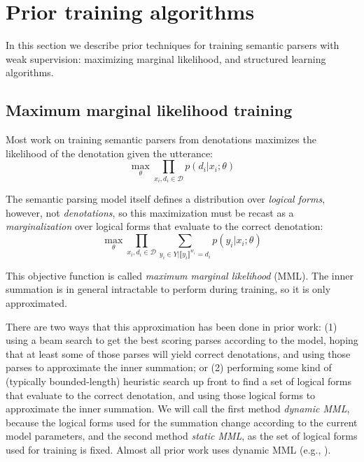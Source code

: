 \section{Prior training algorithms} \label{sec:prior_training}

In this section we describe prior techniques for training semantic parsers with weak supervision: maximizing marginal likelihood, and structured learning algorithms.

\subsection{Maximum marginal likelihood training} \label{sec:mml}

Most work on training semantic parsers from denotations maximizes the likelihood of the denotation given the utterance:
\begin{equation}
\max_\theta \prod_{x_i,d_i \in \mathcal{D}} p(d_i|x_i; \theta)
\end{equation}

\noindent
The semantic parsing model itself defines a distribution over \emph{logical forms}, however, not \emph{denotations}, so this maximization must be recast as a \emph{marginalization} over logical forms that evaluate to the correct denotation:
\begin{equation}
\max_\theta \prod_{x_i,d_i \in \mathcal{D}} \sum_{y_i \in Y | \llbracket y_i \rrbracket^{w_i} = d_i} p(y_i | x_i; \theta)
\end{equation}

\noindent
This objective function is called \emph{maximum marginal likelihood} (MML).  The inner summation is in general intractable to perform during training, so it is only approximated.

There are two ways that this approximation has been done in prior work: (1) using a beam search to get the best scoring parses according to the model, hoping that at least some of those parses will yield correct denotations, and using those parses to approximate the inner summation; or (2) performing some kind of (typically bounded-length) heuristic search up front to find a set of logical forms that evaluate to the correct denotation, and using those logical forms to approximate the inner summation.  We will call the first method \emph{dynamic MML}, because the logical forms used for the summation change according to the current model parameters, and the second method \emph{static MML}, as the set of logical forms used for training is fixed.  Almost all prior work uses dynamic MML (e.g., \citet{liang2011learning,berant2013semantic,goldman2017weakly}).

